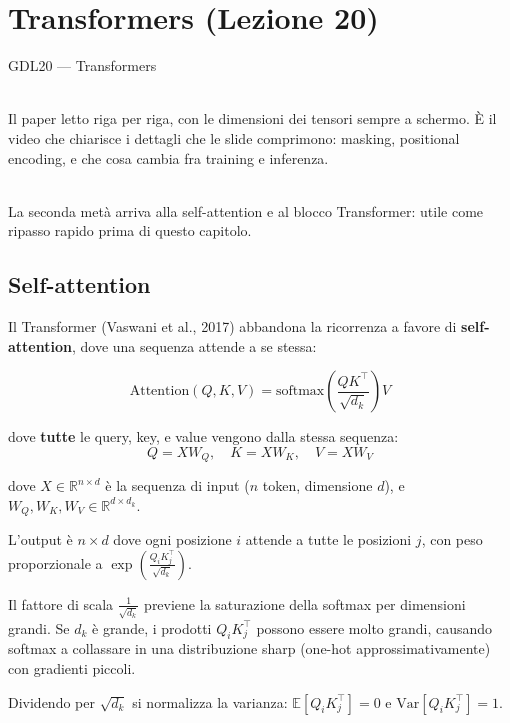 \chapter{Transformers (Lezione 20)}

\begin{risorsevideo}{GDL20 — Transformers}

\medskip
{}\\
Il paper letto riga per riga, con le dimensioni dei tensori sempre a schermo. È il video che chiarisce i dettagli che le slide comprimono: masking, positional encoding, e che cosa cambia fra training e inferenza.

\medskip
{}\\
La seconda metà arriva alla self-attention e al blocco Transformer: utile come ripasso rapido prima di questo capitolo.
\end{risorsevideo}

\section{Self-attention}

Il Transformer (Vaswani et al., 2017) abbandona la ricorrenza a favore di \textbf{self-attention}, dove una sequenza attende a se stessa:

\begin{definition}
\[
\text{Attention}(Q, K, V) = \text{softmax}\left(\frac{QK^\top}{\sqrt{d_k}}\right) V
\]

dove \textbf{tutte} le query, key, e value vengono dalla stessa sequenza:
\[
Q = X W_Q, \quad K = X W_K, \quad V = X W_V
\]

dove $X \in \mathbb{R}^{n \times d}$ è la sequenza di input ($n$ token, dimensione $d$), e $W_Q, W_K, W_V \in \mathbb{R}^{d \times d_k}$.

L'output è $n \times d$ dove ogni posizione $i$ attende a tutte le posizioni $j$, con peso proporzionale a $\exp(\frac{Q_i K_j^\top}{\sqrt{d_k}})$.
\end{definition}

\begin{tcolorbox}[title={Scala $1/\sqrt{d_k}$}]
Il fattore di scala $\frac{1}{\sqrt{d_k}}$ previene la saturazione della softmax per dimensioni grandi. Se $d_k$ è grande, i prodotti $Q_i K_j^\top$ possono essere molto grandi, causando softmax a collassare in una distribuzione sharp (one-hot approssimativamente) con gradienti piccoli.

Dividendo per $\sqrt{d_k}$ si normalizza la varianza: $\mathbb{E}[Q_i K_j^\top] = 0$ e $\text{Var}[Q_i K_j^\top] = 1$.
\end{tcolorbox}

